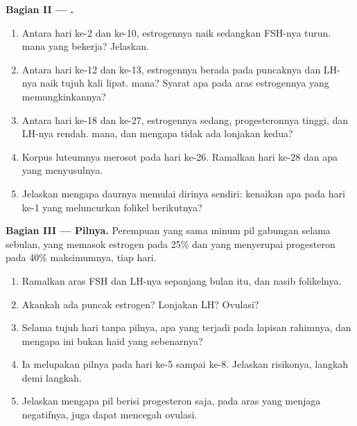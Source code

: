 \begin{problem}
\medskip
\noindent\textbf{Bagian II --- .}
\begin{enumerate}[resume]
  \item Antara hari ke-2 dan ke-10, estrogennya naik sedangkan FSH-nya
        turun.  mana yang bekerja? Jelaskan.
  \item Antara hari ke-12 dan ke-13, estrogennya berada pada puncaknya
        dan LH-nya naik tujuh kali lipat.  mana? Syarat apa
        pada aras estrogennya yang memungkinkannya?
  \item Antara hari ke-18 dan ke-27, estrogennya sedang, progesteronnya
        tinggi, dan LH-nya rendah.  mana, dan mengapa tidak
        ada lonjakan kedua?
  \item Korpus luteumnya merosot pada hari ke-26. Ramalkan  hari
        ke-28 dan apa yang menyusulnya.
  \item Jelaskan mengapa daurnya memulai dirinya sendiri: kenaikan apa
        pada hari ke-1 yang meluncurkan folikel berikutnya?
\end{enumerate}

\medskip
\noindent\textbf{Bagian III --- Pilnya.}
Perempuan yang sama minum pil gabungan selama sebulan, yang memasok
estrogen pada 25\% dan  yang menyerupai progesteron pada 40\%
maksimumnya, tiap hari.
\begin{enumerate}[resume]
  \item Ramalkan aras FSH dan LH-nya sepanjang bulan itu, dan nasib
        folikelnya.
  \item Akankah ada puncak estrogen? Lonjakan LH? Ovulasi?
  \item Selama tujuh hari tanpa pilnya, apa yang terjadi pada lapisan
        rahimnya, dan mengapa ini bukan haid yang sebenarnya?
  \item Ia melupakan pilnya pada hari ke-5 sampai ke-8. Jelaskan
        risikonya, langkah demi langkah.
  \item Jelaskan mengapa pil berisi progesteron saja, pada aras yang
        menjaga  negatifnya, juga dapat mencegah ovulasi.
\end{enumerate}


\end{problem}
